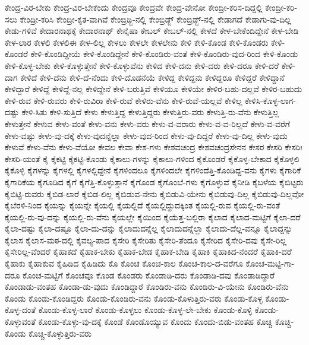 {ಕೇಂದ್ರ-ವಿರ-ಬೇಕು
ಕೇಂದ್ರ-ವಿರ-ಬೇಕೆಂದು
ಕೇಂದ್ರವೂ
ಕೇಂದ್ರವೇ
ಕೇಂದ್ರ-ವೇನೋ
ಕೇಂದ್ರೀ-ಕರಿಸ-ದಿದ್ದಲ್ಲಿ
ಕೇಂದ್ರೀ-ಕರಿ-ಸಲು
ಕೇಂದ್ರೀ-ಕರಿಸಿ
ಕೇಂದ್ರೀ-ಕೃತ-ವಾಗಿವೆ
ಕೇಂಬ್ರಿಡ್ಜಿ-ನಲ್ಲಿ
ಕೇಂಬ್ರಿಡ್ಜ್
ಕೇಂಬ್ರಿಡ್ಜ್‌-ನಲ್ಲಿ
ಕೇಡಾಗದೆ
ಕೇಡಾಗು-ವು-ದಿಲ್ಲ
ಕೇಡು-ಗಳಿವೆ
ಕೇದಾರನಾಥಕ್ಕೆ
ಕೇದಾರನಾಥ್
ಕೇನೈಷಾ
ಕೇಬಲ್
ಕೇಬಲ್‌-ನಲ್ಲಿ
ಕೇಳದೆ
ಕೇಳ-ಬೇಕೆಂದಿದ್ದೇನೆ
ಕೇಳ-ಬೇಡಿ
ಕೇಳ-ಲಾರ
ಕೇಳಲಿ
ಕೇಳಲಿಈ
ಕೇಳ-ಲಿಲ್ಲ
ಕೇಳಲು
ಕೇಳಲೇ
ಕೇಳಲೇನು
ಕೇಳಿ
ಕೇಳಿ-ಕೊಂಡ
ಕೇಳಿ-ಕೊಂಡರು
ಕೇಳಿ-ಕೊಂಡರೆ
ಕೇಳಿ-ಕೊಂಡಿದ್ದೀಯೆ
ಕೇಳಿ-ಕೊಂಡಿದ್ದೇನೆ
ಕೇಳಿ-ಕೊಂಡಿರು-ವಂತೆ
ಕೇಳಿ-ಕೊಂಡಿರು-ವುದ-ರಿಂದ
ಕೇಳಿ-ಕೊಂಡು
ಕೇಳಿ-ಕೊಳ್ಳ-ಬೇಕು
ಕೇಳಿ-ಕೊಳ್ಳುತ್ತೇನೆ
ಕೇಳಿ-ಕೊಳ್ಳುವೆನು
ಕೇಳಿದ
ಕೇಳಿ-ದನು
ಕೇಳಿ-ದರು
ಕೇಳಿ-ದರೂ
ಕೇಳಿ-ದರೆ
ಕೇಳಿ-ದಾಗ
ಕೇಳಿದೆ
ಕೇಳಿ-ದೆನು
ಕೇಳಿ-ದೆ-ನೆಂದು
ಕೇಳಿ-ದೊಡನೆಯೆ
ಕೇಳಿದ್ದ
ಕೇಳಿದ್ದನು
ಕೇಳಿದ್ದರೂ
ಕೇಳಿದ್ದರೆ
ಕೇಳಿದ್ದಾನೆ
ಕೇಳಿದ್ದಾರೆ
ಕೇಳಿದ್ದೆ
ಕೇಳಿದ್ದೆ-ನಲ್ಲ
ಕೇಳಿದ್ದೇನೆ
ಕೇಳಿ-ಬರುತ್ತಿವೆ
ಕೇಳಿಯೂ
ಕೇಳಿಯೇ
ಕೇಳಿರ-ಬಹು-ದಲ್ಲವೆ
ಕೇಳಿರ-ಬಹುದು
ಕೇಳಿ-ರುವ
ಕೇಳಿ-ರುವರು
ಕೇಳಿ-ರುವಿರಾ
ಕೇಳಿ-ರುವೆ
ಕೇಳಿರು-ವೆನು
ಕೇಳಿ-ರುವೆ-ಯಲ್ಲವೆ
ಕೇಳಿಲ್ಲ
ಕೇಳಿಸಿ-ಕೊಳ್ಳ-ಲಾಗ-ದಷ್ಟು
ಕೇಳಿ-ಸಿತು
ಕೇಳಿ-ಸುತ್ತಿದೆ
ಕೇಳು
ಕೇಳುತ್ತಿದ್ದ
ಕೇಳುತ್ತಿದ್ದರು
ಕೇಳುತ್ತಿರು-ವರು
ಕೇಳುತ್ತಿ-ರು-ವೆನು
ಕೇಳುತ್ತಿಲ್ಲ
ಕೇಳುತ್ತೇನೆ
ಕೇಳುವ
ಕೇಳು-ವಂತೆ
ಕೇಳು-ವನು
ಕೇಳು-ವರು
ಕೇಳು-ವ-ವರಾರು
ಕೇಳು-ವ-ವ-ರಿಲ್ಲದೆ
ಕೇಳು-ವ-ವರೆಗೆ
ಕೇಳು-ವಷ್ಟು
ಕೇಳು-ವು-ದಕ್ಕೆ
ಕೇಳು-ವುದನ್ನೆಲ್ಲಾ
ಕೇಳು-ವುದ-ರಿಂದ
ಕೇಳು-ವು-ದಿದ್ದರೆ
ಕೇಳು-ವು-ದಿಲ್ಲ
ಕೇಳು-ವುದು
ಕೇಳುವೆ
ಕೇಳು-ವೆನು
ಕೇಳು-ವೆಯೋ
ಕೇವಲ
ಕೇವಾ
ಕೇಶ-ಗಳು
ಕೇಶವಚಂದ್ರ
ಕೇಶವಚಂದ್ರಸೇನನ
ಕೇಸರ
ಕೇಸರಿ
ಕೇಸರಿಃ
ಕೇಸರಿ-ಯಂತೆ
ಕೈ
ಕೈಕಟ್ಟಿ
ಕೈಕಟ್ಟಿ-ಕೊಂಡು
ಕೈಕಾಲು-ಗಳನ್ನು
ಕೈಕಾಲು-ಗಳಿಂದ
ಕೈಕೊಂಡರೆ
ಕೈಕೊಳ್ಳ-ಬೇಕಾದ
ಕೈಕೊಳ್ಳಲಿ
ಕೈಕೊಳ್ಳಿ
ಕೈಗಳನ್ನು
ಕೈಗಳಲ್ಲಿ
ಕೈಗಳಲ್ಲಿದ್ದೇನೆ
ಕೈಗಳಿಂದಲೂ
ಕೈಗಳಿಂದಲೇ
ಕೈಗಳಿಂದೆತ್ತಿ-ಕೊಂಡಿದ್ದ-ವನು
ಕೈಗಳು
ಕೈಗಾರಿಕೆ
ಕೈಗಾರಿಕೆಯ
ಕೈಗೂಡಿದ
ಕೈಗೆ
ಕೈಗೆತ್ತಿ-ಕೊಳ್ಳುತ್ತಾನೆ
ಕೈಗೊಂಡ
ಕೈಗೊಂಬೆ-ಗಳು
ಕೈಗೊಳ್ಳುವೆ
ಕೈನೀಡಿ
ಕೈಬಳೆಯ
ಕೈಬಿಟ್ಟರು
ಕೈಬಿಟ್ಟಿ-ರುವರು
ಕೈಬಿಡ-ಲಾರೆ
ಕೈಬಿಡ-ಲಿಲ್ಲ
ಕೈಬಿಡುವ-ನೇನು
ಕೈಬಿಡುವಿ-ಯೇನು
ಕೈಬಿಡುವು-ದಿಲ್ಲ
ಕೈಬಿಡುವು-ದಿಲ್ಲವೋ
ಕೈಬೆರಳಿ-ನಿಂದ
ಕೈಯನ್ನು
ಕೈಯನ್ನೇ
ಕೈಯಲ್ಲಿ
ಕೈಯಲ್ಲಿದೆ
ಕೈಯಲ್ಲಿದ್ದುದಕ್ಕಿಂತ
ಕೈಯಲ್ಲಿ-ರುವ
ಕೈಯಲ್ಲಿ-ರು-ವಂತೆ
ಕೈಯಲ್ಲಿ-ರು-ವು-ದನ್ನು
ಕೈಯಲ್ಲಿ-ರು-ವೆನು
ಕೈಯಲ್ಲೇ
ಕೈಯಿಂದ
ಕೈಯೆತ್ತ-ಬಲ್ಲಿರಾ
ಕೈಲಾದ
ಕೈಲಾದ-ಮಟ್ಟಿಗೆ
ಕೈಲಾ-ದರೆ
ಕೈಲಾ-ದಷ್ಟು
ಕೈಲಾ-ದಷ್ಟೂ
ಕೈಲಾ-ದು-ದನ್ನು
ಕೈಲಾದುದನ್ನೆಲ್ಲ
ಕೈಲಾದುದನ್ನೆಲ್ಲಾ
ಕೈಲಾದು-ದೆಲ್ಲ-ವನ್ನೂ
ಕೈಲಾದ್ದನ್ನು
ಕೈಲಾಸ
ಕೈಲಾಸ-ಮಠ-ದಲ್ಲಿ
ಕೈವಲ್ಯ-ಪಾದ
ಕೈಸೇರಿ
ಕೈಸೇರಿತು
ಕೈಸೇರಿ-ತೆಂದೂ
ಕೈಸೇರಿದ
ಕೈಸೇರಿ-ದವು
ಕೈಸೇ-ರಿಲ್ಲ
ಕೈಸೇರಿಲ್ಲ-ವೆಂದರೆ
ಕೈಹಾಕದೆ
ಕೈಹಾಕ-ಬೇಕು
ಕೈಹಾಕ-ಬೇಡ
ಕೈಹಾಕ-ಬೇಡಿ
ಕೈಹಾಕಿ
ಕೈಹಾಕಿದ-ನೆಂದರೆ
ಕೈಹಾಕಿ-ದರೆ
ಕೈಹಾಕು
ಕೈಹಾಕುವ
ಕೈಹಿಡಿದ
ಕೈಹಿಡಿದು
ಕೊ
ಕೊಂಚ
ಕೊಂಚ-ಕಾಲ
ಕೊಂಚ-ಕಾಲ-ದ-ವರೆಗೂ
ಕೊಂಚ-ಮಟ್ಟಿ-ಗಾ-ದರೂ
ಕೊಂಚ-ಮಟ್ಟಿಗೆ
ಕೊಂಚವೂ
ಕೊಂಡ
ಕೊಂಡರು
ಕೊಂಡಾಡಿ-ದರು
ಕೊಂಡಾಡಿ-ದವು
ಕೊಂಡಾಡಿದ್ದಾರೆ
ಕೊಂಡಾಡು-ವಂತಹ
ಕೊಂಡಾ-ಡು-ವುದು
ಕೊಂಡಿದ್ದಾರೆ
ಕೊಂಡಿರು-ವನು
ಕೊಂಡಿರು-ವಿ-ಯೇನು
ಕೊಂಡಿರು-ವೆನು
ಕೊಂಡು
ಕೊಂಡು-ಕೊಂಡಿದ್ದರು
ಕೊಂಡು-ಕೊಂಡಿರು-ವನು
ಕೊಂಡು-ಕೊಳುತ್ತಿರು-ವರು
ಕೊಂಡು-ಕೊಳ್ಳ
ಕೊಂಡು-ಕೊಳ್ಳ-ದಂತೆ
ಕೊಂಡು-ಕೊಳ್ಳ-ಲಾರೆ
ಕೊಂಡು-ಕೊಳ್ಳಲು
ಕೊಂಡು-ಕೊಳ್ಳ-ಲೇ-ಬೇಕು
ಕೊಂಡು-ಕೊಳ್ಳಿ
ಕೊಂಡು-ಕೊಳ್ಳುವಂತೆ
ಕೊಂಡು-ಕೊಳ್ಳು-ವು-ದಕ್ಕೆ
ಕೊಂಡೆ
ಕೊಂಡೊಯ್ಯುವ
ಕೊಂದು
ಕೊಂದು-ಬಿಡು-ವಂತಹ
ಕೊಚ್ಚಿ
ಕೊಚ್ಚಿ-ಕೊಂಡು
ಕೊಚ್ಚಿ-ಕೊಳ್ಳುತ್ತಿರು-ವರು
}
